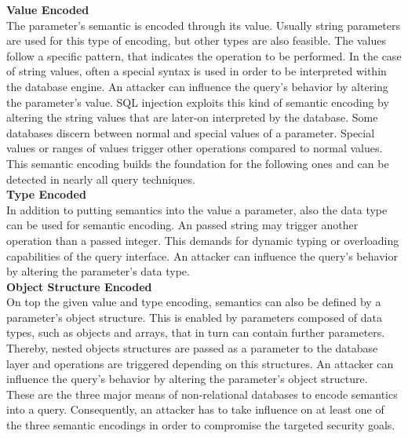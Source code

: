 \textbf{Value Encoded} \\
The parameter's semantic is encoded through its value. Usually string parameters are used for this type of encoding, but other types are also feasible. The values follow a specific pattern, that indicates the operation to be performed. In the case of string values, often a special syntax is used in order to be interpreted within the database engine. An attacker can influence the query's behavior by altering the parameter's value. SQL injection exploits this kind of semantic encoding by altering the string values that are later-on interpreted by the database. Some databases discern between normal and special values of a parameter. Special values or ranges of values trigger other operations compared to normal values. This semantic encoding builds the foundation for the following ones and can be detected in nearly all query techniques.\\

\textbf{Type Encoded} \\
In addition to putting semantics into the value a parameter, also the data type can be used for semantic encoding. An passed string may trigger another operation than a passed integer. This demands for dynamic typing or overloading capabilities of the query interface. An attacker can influence the query's behavior by altering the parameter's data type.\\

\textbf{Object Structure Encoded} \\
On top the given value and type encoding, semantics can also be defined by a parameter's object structure. This is enabled by parameters composed of data types, such as objects and arrays, that in turn can contain further parameters. Thereby, nested objects structures are passed as a parameter to the database layer and operations are triggered depending on this structures. An attacker can influence the query's behavior by altering the parameter's object structure.\\

These are the three major means of non-relational databases to encode semantics into a query. Consequently, an attacker has to take influence on at least one of the three semantic encodings in order to compromise the targeted security goals.

